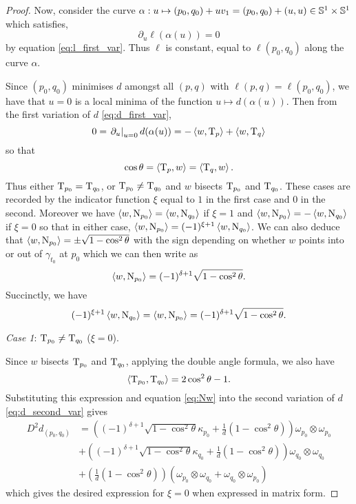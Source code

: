 \documentclass[a4paper, 12pt]{amsart}
\begin{document}
\begin{proof}
Now, consider the curve $\alpha: u \mapsto (p_0,q_0) + uv_1 = (p_0,q_0) + (u, u) \in \S^1\times \S^1$ which satisfies,
\[
\partial_u \ell(\alpha(u)) = 0 
\]
by equation \eqref{eq:l_first_var}. Thus $\ell$ is constant, equal to $\ell(p_0, q_0)$ along the curve $\alpha$. 

Since $(p_0, q_0)$ minimises $d$ amongst all $(p,q)$ with $\ell(p, q) = \ell(p_0, q_0)$, we have that $u=0$ is a local minima of the function $u\mapsto d(\alpha(u))$. Then from the first variation of $d$ \eqref{eq:d_first_var},
\[
0 = \left.\partial_u\right|_{u=0} d(\alpha(u)) = -\inpr{w}{\tang_p} + \inpr{w}{\tang_q}
\]
so that
\[
\cos\theta = \inpr{\tang_p}{w} = \inpr{\tang_q}{w}.
\]
Thus either $\tang_{p_0} = \tang_{q_0}$, or $\tang_{p_0} \ne \tang_{q_0}$ and $w$ bisects $\tang_{p_0}$ and $\tang_{q_0}$. These cases are recorded by the indicator function $\xi$ equal to \(1\) in the first case and \(0\) in the second. Moreover we have $\inpr{w}{\nor_{p_0}} = \inpr{w}{\nor_{q_0}}$ if \(\xi = 1\) and $\inpr{w}{\nor_{p_0}} = -\inpr{w}{\nor_{q_0}}$ if \(\xi=0\) so that in either case, $\inpr{w}{\nor_{p_0}} = (-1)^{\xi + 1} \inpr{w}{\nor_{q_0}}$. We can also deduce that $\inpr{w}{\nor_{p_0}} = \pm \sqrt{1-\cos^2\theta}$ with the sign depending on whether $w$ points into or out of $\gamma_{t_0}$ at $p_0$ which we can then write as
\[
\inpr{w}{\nor_{p_0}} = (-1)^{\delta+1} \sqrt{1-\cos^2\theta}.
\]
Succinctly, we have
\begin{equation}
\label{eq:Nw}
(-1)^{\xi+1} \inpr{w}{\nor_{q_0}} = \inpr{w}{\nor_{p_0}} =  (-1)^{\delta+1} \sqrt{1-\cos^2\theta}.
\end{equation}

\emph{Case 1}: $\tang_{p_0} \ne \tang_{q_0}$ ($\xi = 0$).

Since $w$ bisects $\tang_{p_0}$ and $\tang_{q_0}$, applying the double angle formula, we also have 
\[
\inpr{\tang_{p_0}}{\tang_{q_0}} = 2\cos^2\theta - 1.
\]
Substituting this expression and equation \eqref{eq:Nw} into the second variation of $d$ \eqref{eq:d_second_var} gives
\begin{align*}
D^2d_{(p_0,q_0)} &=  \left((-1)^{\delta+1} \sqrt{1-\cos^2\theta}\kappa_{p_0} + \frac{1}{d}(1 - \cos^2\theta) \right) \omega_{p_0} \otimes \omega_{p_0} \\
&+ \left((-1)^{\delta+1} \sqrt{1-\cos^2\theta} \kappa_{q_0} + \frac{1}{d}(1 - \cos^2\theta) \right) \omega_{q_0} \otimes \omega_{q_0} \\
&+ \left(\frac{1}{d}(1 - \cos^2\theta) \right) \left(\omega_{p_0} \otimes \omega_{q_0} + \omega_{q_0} \otimes \omega_{p_0} \right)
\end{align*}
which gives the desired expression for $\xi=0$ when expressed in matrix form.


\end{proof}
\end{document}
